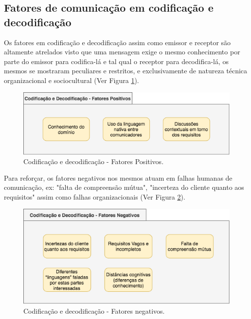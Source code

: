 \subsection{Fatores de comunicação em codificação e decodificação}
Os fatores em codificação e decodificação assim como emissor e receptor são altamente atrelados visto que uma mensagem exige o mesmo conhecimento por parte do emissor para codifica-lá e tal qual o receptor para decodifica-lá, os mesmos se mostraram peculiares e restritos, e exclusivamente de natureza técnica organizacional e sociocultural (Ver Figura \ref{fig:quadro7}).

\begin{figure}[h!] %
	\begin{center}
	    \caption{Codificação e decodificação - Fatores Positivos.}
	    \label{fig:quadro7}
	    \includegraphics[scale=0.6]{figuras/quadro7} %
	\end{center}
	
\end{figure}

Para reforçar, os fatores negativos nos mesmos atuam em falhas humanas de comunicação, ex: "falta de compreensão mútua", "incerteza do cliente quanto aos requisitos" assim como falhas organizacionais (Ver Figura \ref{fig:quadro8}). 


\begin{figure}[h!] %
	\begin{center}
	    \caption{Codificação e decodificação - Fatores negativos.}
	    	\label{fig:quadro8}
	    \includegraphics[scale=0.6]{figuras/quadro8} %
	\end{center}

\end{figure}

